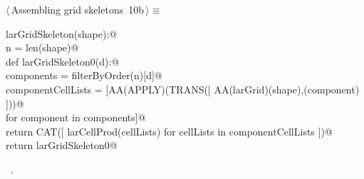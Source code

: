 \documentclass[11pt,oneside]{article}	%
\begin{document}
\begin{flushleft} \small \label{scrap15}
\protect{}$\langle\,$Assembling grid skeletons\nobreak\ {\footnotesize 10b}$\,\rangle\equiv$
\vspace{-1ex}
\begin{list}{}{} \item
\mbox{}\verb@def larGridSkeleton(shape):@\\
\mbox{}\verb@    n = len(shape)@\\
\mbox{}\verb@    def larGridSkeleton0(d):@\\
\mbox{}\verb@        components = filterByOrder(n)[d]@\\
\mbox{}\verb@        componentCellLists = [AA(APPLY)(TRANS([ AA(larGrid)(shape),(component) ]))@\\
\mbox{}\verb@                              for component in components]@\\
\mbox{}\verb@        return CAT([ larCellProd(cellLists)  for cellLists in componentCellLists ])@\\
\mbox{}\verb@    return larGridSkeleton0@\\
\mbox{}\verb@@{\NWsep}
\end{list}
\vspace{-1ex}
\footnotesize\addtolength{\baselineskip}{-1ex}
\begin{list}{}{\setlength{\itemsep}{-\parsep}\setlength{\itemindent}{-\leftmargin}}
\item \NWtxtMacroRefIn\ .
\end{list}
\end{flushleft}
\end{document}
